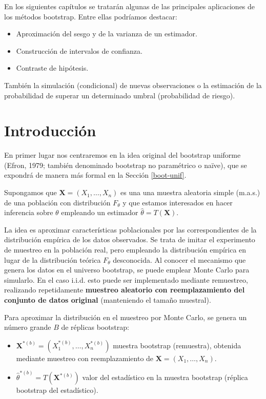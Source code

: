 \documentclass[
]{book}
\theoremstyle{break}
\theoremstyle{nonumberplain}
\begin{document}
En los siguientes capítulos se tratarán algunas de las principales aplicaciones de los métodos bootstrap.
Entre ellas podríamos destacar:

\begin{itemize}
\item
  Aproximación del sesgo y de la varianza de un estimador.
\item
  Construcción de intervalos de confianza.
\item
  Contraste de hipótesis.
\end{itemize}

También la simulación (condicional) de nuevas observaciones o la estimación de la probabilidad de superar un determinado umbral (probabilidad de riesgo).

\hypertarget{boot-intro}{%
\section{Introducción}\label{boot-intro}}

En primer lugar nos centraremos en la idea original del bootstrap uniforme (Efron, 1979; también denominado bootstrap no paramétrico o naïve), que se expondrá de manera más formal en la Sección \ref{boot-unif}.

Supongamos que \(\mathbf{X}=\left( X_1,\ldots ,X_n \right)\) es una una muestra aleatoria simple (m.a.s.)
de una población con distribución \(F_{\theta}\) y que estamos interesados en hacer inferencia sobre \(\theta\) empleando un estimador \(\hat{\theta} = T\left( \mathbf{X} \right)\).

La idea es aproximar características poblacionales por las correspondientes de la distribución empírica de los
datos observados.
Se trata de imitar el experimento de muestreo en la población real, pero empleando la distribución empírica en lugar de la distribución teórica \(F_{\theta}\) desconocida.
Al conocer el mecanismo que genera los datos en el universo bootstrap, se puede emplear Monte Carlo para simularlo.
En el caso i.i.d. esto puede ser implementado mediante remuestreo, realizando repetidamente \textbf{muestreo aleatorio con reemplazamiento del conjunto de datos original} (manteniendo el tamaño muestral).

Para aproximar la distribución en el muestreo por Monte Carlo, se genera un número grande \(B\) de réplicas bootstrap:

\begin{itemize}
\item
  \(\mathbf{X}^{\ast (b)}=\left( X_1^{\ast (b)},\ldots ,X_n^{\ast (b)} \right)\) muestra bootstrap (remuestra),
  obtenida mediante muestreo con reemplazamiento de \(\mathbf{X}=\left( X_1,\ldots ,X_n \right)\).
\item
  \(\hat{\theta}^{\ast (b)} = T\left( \mathbf{X}^{\ast (b)} \right)\)
  valor del estadístico en la muestra bootstrap (réplica bootstrap del estadístico).
\end{itemize}
\end{document}

